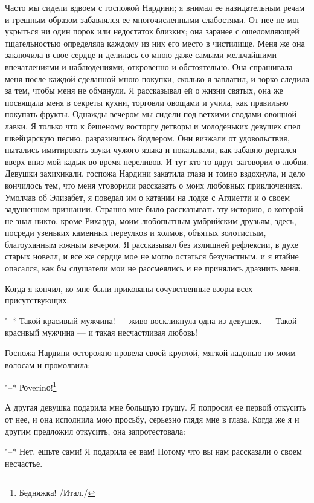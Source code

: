 Часто мы сидели  вдвоем с госпожой Нардини; я  внимал ее назидательным
речам и  грешным образом забавлялся ее  многочисленными слабостями. От
нее не мог укрыться ни один  порок или недостаток близких; она заранее
с ошеломляющей  тщательностью определяла  каждому из  них его  место в
чистилище. Меня  же она  заключила в  свое сердце  и делилась  со мною
даже  самыми мельчайшими  впечатлениями и  наблюдениями, откровенно  и
обстоятельно. Она спрашивала меня после каждой сделанной мною покупки,
сколько я заплатил, и зорко следила  за тем, чтобы меня не обманули. Я
рассказывал ей о жизни святых, она  же посвящала меня в секреты кухни,
торговли  овощами  и учила,  как  правильно  покупать фрукты.  Однажды
вечером мы  сидели под ветхими сводами  овощной лавки. Я только  что к
бешеному  восторгу  детворы  и молоденьких  девушек  спел  швейцарскую
песню, разразившись  йодлером. Они  визжали от  удовольствия, пытались
имитировать  звуки чужого  языка  и показывали,  как забавно  дергался
вверх-вниз мой кадык во время  переливов. И тут кто-то вдруг заговорил
о любви.  Девушки захихикали, госпожа  Нардини закатила глаза  и томно
вздохнула, и дело кончилось тем,  что меня уговорили рассказать о моих
любовных приключениях. Умолчав об Элизабет,  я поведал им о катании на
лодке  с Аглиетти  и о  своем задушенном  признании. Странно  мне было
рассказывать  эту историю,  о которой  не знал  никто, кроме  Рихарда,
моим любопытным  умбрийским друзьям, здесь, посреди  узеньких каменных
переулков и холмов, объятых  золотистым, благоуханным южным вечером. Я
рассказывал без  излишней рефлексии,  в духе старых  новелл, и  все же
сердце мое не могло остаться безучастным,  и я втайне опасался, как бы
слушатели мои не рассмеялись и не принялись дразнить меня.

Когда  я  кончил,  ко  мне были  прикованы  сочувственные  взоры  всех
присутствующих.

"--* Такой красивый мужчина! --- живо воскликнула одна из девушек. ---
Такой красивый мужчина --- и такая несчастливая любовь!

Госпожа  Нардини осторожно  провела своей  круглой, мягкой  ладонью по
моим волосам и промолвила:

"--* Роverinо!\footnote{Бедняжка! /Итал./}

А  другая девушка  подарила мне  большую грушу.  Я попросил  ее первой
откусить от  нее, и она  исполнила мою  просьбу, серьезно глядя  мне в
глаза. Когда же я и другим предложил откусить, она запротестовала:

"--* Нет, ешьте сами! Я подарила  ее вам! Потому что вы нам рассказали
о своем несчастье.

